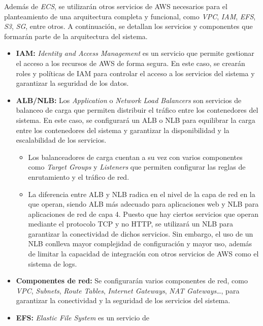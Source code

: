 Además de \textit{ECS}, se utilizarán otros servicios de AWS necesarios para el
planteamiento de una arquitectura completa y funcional, como \textit{VPC},
\textit{IAM}, \textit{EFS}, \textit{S3}, \textit{SG}, entre otros. A
continuación, se detallan los servicios y componentes que formarán parte de la
arquitectura del sistema.

\begin{itemize}
	\item \textbf{IAM:} \textit{Identity and Access Management} es un servicio
		que permite gestionar el acceso a los recursos de AWS de forma segura.
		En este caso, se crearán roles y políticas de IAM para controlar el
		acceso a los servicios del sistema y garantizar la seguridad de los
		datos.
	\item \textbf{ALB/NLB:} Los \textit{Application} o \textit{Network Load
		Balancers} son servicios de balanceo de carga que permiten distribuir
		el tráfico entre los contenedores del sistema. En este caso, se
		configurará un ALB o NLB para equilibrar la carga entre los contenedores
		del sistema y garantizar la disponibilidad y la escalabilidad de los
		servicios. \begin{itemize}
			\item Los balanceadores de carga cuentan a su vez con varios
				componentes como \textit{Target Groups} y \textit{Listeners} que
				permiten configurar las reglas de enrutamiento y el tráfico de red.
			\item La diferencia entre ALB y NLB radica en el nivel de la capa
				de red en la que operan, siendo ALB más adecuado para
				aplicaciones web y NLB para aplicaciones de red de capa 4.
				Puesto que hay ciertos servicios que operan mediante el
				protocolo TCP y no HTTP, se utilizará un NLB para garantizar
				la conectividad de dichos servicios. Sin embargo, el uso de un
				NLB conlleva mayor complejidad de configuración y mayor uso,
				además de limitar la capacidad de integración con otros
				servicios de AWS como el sistema de logs.
		\end{itemize}
	\item \textbf{Componentes de red:} Se configurarán varios componentes de
		red, como \textit{VPC}, \textit{Subnets}, \textit{Route Tables},
		\textit{Internet Gateways}, \textit{NAT Gateways}\ldots, para garantizar
		la conectividad y la seguridad de los servicios del sistema.
	\item \textbf{EFS:} \textit{Elastic File System} es un servicio de

\end{itemize}
